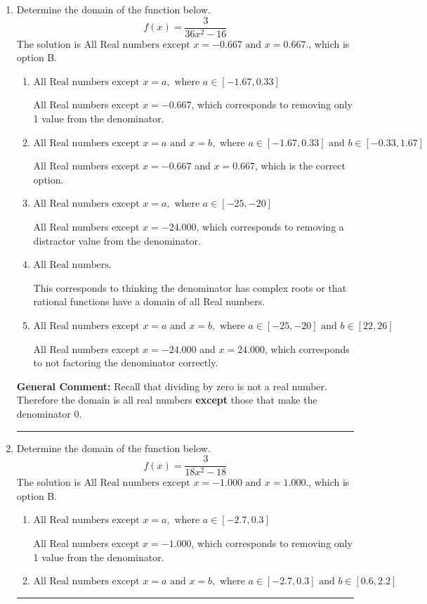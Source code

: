 \documentclass{extbook}[14pt]
\newcommand{\litem}[1]{\item #1

\rule{\textwidth}{0.4pt}}
\begin{document}
\begin{enumerate}\litem{
Determine the domain of the function below.
\[ f(x) = \frac{3}{36x^{2} -16} \]The solution is \( \text{All Real numbers except } x = -0.667 \text{ and } x = 0.667. \), which is option B.\begin{enumerate}[label=\Alph*.]
\item \( \text{All Real numbers except } x = a, \text{ where } a \in [-1.67, 0.33] \)

All Real numbers except $x = -0.667$, which corresponds to removing only 1 value from the denominator.
\item \( \text{All Real numbers except } x = a \text{ and } x = b, \text{ where } a \in [-1.67, 0.33] \text{ and } b \in [-0.33, 1.67] \)

All Real numbers except $x = -0.667$ and $x = 0.667$, which is the correct option.
\item \( \text{All Real numbers except } x = a, \text{ where } a \in [-25, -20] \)

All Real numbers except $x = -24.000$, which corresponds to removing a distractor value from the denominator.
\item \( \text{All Real numbers.} \)

This corresponds to thinking the denominator has complex roots or that rational functions have a domain of all Real numbers.
\item \( \text{All Real numbers except } x = a \text{ and } x = b, \text{ where } a \in [-25, -20] \text{ and } b \in [22, 26] \)

All Real numbers except $x = -24.000$ and $x = 24.000$, which corresponds to not factoring the denominator correctly.
\end{enumerate}

\textbf{General Comment:} Recall that dividing by zero is not a real number. Therefore the domain is all real numbers \textbf{except} those that make the denominator 0.
}
\litem{
Determine the domain of the function below.
\[ f(x) = \frac{3}{18x^{2} -18} \]The solution is \( \text{All Real numbers except } x = -1.000 \text{ and } x = 1.000. \), which is option B.\begin{enumerate}[label=\Alph*.]
\item \( \text{All Real numbers except } x = a, \text{ where } a \in [-2.7, 0.3] \)

All Real numbers except $x = -1.000$, which corresponds to removing only 1 value from the denominator.
\item \( \text{All Real numbers except } x = a \text{ and } x = b, \text{ where } a \in [-2.7, 0.3] \text{ and } b \in [0.6, 2.2] \)


\end{enumerate}}
\end{enumerate}
\end{document}

